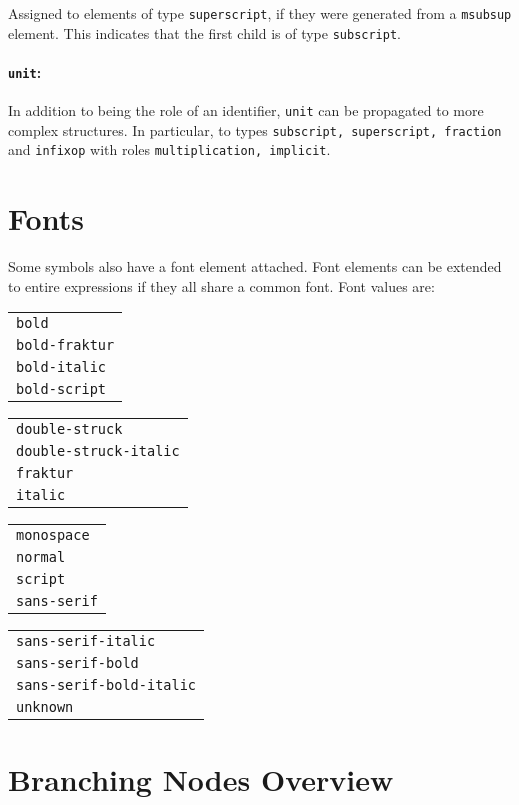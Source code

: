 \documentclass{article}
\def\mathml#1{\texttt{#1}}
\begin{document}
Assigned to elements of type \texttt{superscript}, if they were generated from a
\mathml{msubsup} element.  This indicates that the first child is of type
\texttt{subscript}.


\paragraph{\texttt{unit}:}

In addition to being the role of an identifier, \texttt{unit} can be propagated
to more complex structures. In particular, to types \texttt{subscript,
  superscript, fraction} and \texttt{infixop} with roles \texttt{multiplication,
  implicit}.


\section{Fonts}
\label{sec:fonts}

Some symbols also have a font element attached. Font elements can be extended to
entire expressions if they all share a common font. Font values are:\vspace*{.5cm}

\noindent
\begin{tabular}{>{\tt}l}
  bold\\
  bold-fraktur\\
  bold-italic\\
  bold-script
\end{tabular}\quad
\begin{tabular}{>{\tt}l}
  double-struck\\
  double-struck-italic\\
  fraktur\\
  italic\\
\end{tabular}\quad
\begin{tabular}{>{\tt}l}
  monospace\\
  normal\\
  script\\
  sans-serif\\
\end{tabular}\quad
\begin{tabular}{>{\tt}l}
  sans-serif-italic\\
  sans-serif-bold\\
  sans-serif-bold-italic\\
  unknown
\end{tabular}

\section{Branching Nodes Overview}
\label{sec:branching-nodes-overview}
\end{document}
